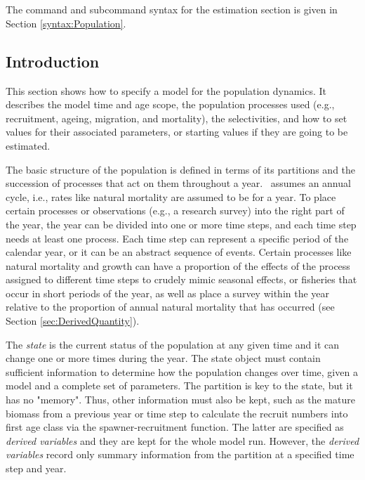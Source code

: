 \section{\label{sec:Population}}

The command and subcommand syntax for the estimation section is given in Section \ref{syntax:Population}.

\subsection{Introduction}

This section shows how to specify a model for the population dynamics. It describes the model time and age scope, the population processes used (e.g., recruitment, ageing, migration, and mortality), the selectivities, and how to set values for their associated parameters, or starting values if they are going to be estimated.

The basic structure of the population is defined in terms of its partitions and the succession of processes that act on them throughout a year. \CNAME\ assumes an annual cycle, i.e., rates like natural mortality are assumed to be for a year. To place certain processes or observations (e.g., a research survey) into the right part of the year, the year can be divided into one or more time steps, and each time step needs  at least one process. Each time step can represent a specific period of the calendar year, or it can be an abstract sequence of events. Certain processes like natural mortality and growth can have a proportion of the effects of the process assigned to different time steps to crudely mimic seasonal effects, or fisheries that occur in short periods of the year, as well as place a survey within the year relative to the proportion of annual natural mortality that has occurred (see Section \ref{sec:DerivedQuantity}).

The \emph{state} is the current status of the population at any given time and it can change one or more times during the year. The state object must contain sufficient information to determine how the population changes over time, given a model and a complete set of parameters. The partition is key to the state, but it has no "memory". Thus, other information must also be kept, such as the mature biomass from a previous year or time step to calculate the recruit numbers into first age class via the spawner-recruitment function. The latter are specified as \emph{derived variables} and they are kept for the whole model run. However, the \emph{derived variables}  record only summary information from the partition at a specified time step and year.

